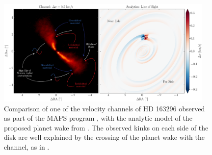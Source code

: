 \begin{figure}
    \centering
    \includegraphics[width = 0.95\textwidth]{figures/labeled_channel.pdf}
    \caption{Comparison of one of the velocity channels of HD 163296 observed as part of the MAPS program \citep{oberg2021}, with the analytic model \citep{bollati2021} of the proposed planet wake from \citet{calcino2022}. The observed kinks on each side of the disk are well explained by the crossing of the planet wake with the channel, as in \citet{bollati2021}.}
    \label{fig:wake_channel}
\end{figure}